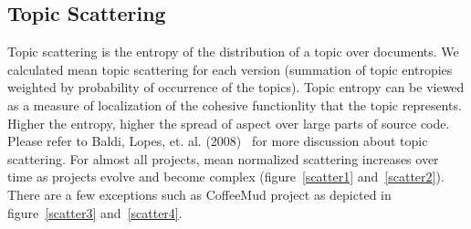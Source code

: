 \documentclass[12pt]{article}
\begin{document}
\subsection{Topic Scattering}
Topic scattering is the entropy of the distribution of a topic over documents. We calculated mean topic scattering for each version (summation of topic entropies weighted by probability of occurrence of the topics). Topic entropy can be viewed as a measure of localization of the cohesive functionlity that the topic represents. Higher the entropy, higher the spread of aspect over large parts of source code. Please refer to Baldi, Lopes, et. al. (2008)~\cite{Baldi:2008:TAL:1449955.1449807} for more discussion about topic scattering.
For almost all projects, mean normalized scattering increases over time as projects evolve and become complex (figure~\ref{scatter1} and~\ref{scatter2}). There are a few exceptions such as CoffeeMud project as depicted in figure~\ref{scatter3} and~\ref{scatter4}.
\end{document}
